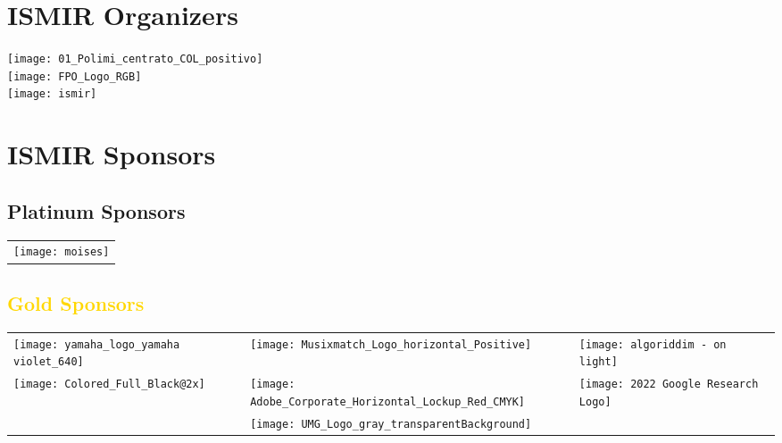 \section*{\textbf{ISMIR Organizers}}
\begin{center}
\vfill
\texttt{[image: 01\_Polimi\_centrato\_COL\_positivo]}\\
\vfill
\texttt{[image: FPO\_Logo\_RGB]}\\
\vfill
\texttt{[image: ismir]}\\
\vfill
\end{center}
\clearpage


\section*{\textbf{ISMIR Sponsors}}
\begingroup %
\renewcommand{\arraystretch}{3}

\vfill

\subsection*{\textcolor{platinum}{Platinum Sponsors}}
\begin{tabularx}{\textwidth} { 
 >{\centering\arraybackslash}X
}
\texttt{[image: moises]}
\\
\end{tabularx}

\vfill

\subsection*{\textcolor{gold}{Gold Sponsors}}
\begin{tabularx}{\textwidth} { 
 >{\centering\arraybackslash}X 
 >{\centering\arraybackslash}X 
 >{\centering\arraybackslash}X
}
\texttt{[image: yamaha\_logo\_yamaha violet\_640]} &
\texttt{[image: Musixmatch\_Logo\_horizontal\_Positive]} &
\texttt{[image: algoriddim - on light]}\\

\texttt{[image: Colored\_Full\_Black@2x]} &
\texttt{[image: Adobe\_Corporate\_Horizontal\_Lockup\_Red\_CMYK]} &
\texttt{[image: 2022 Google Research Logo]}\\

&
\texttt{[image: UMG\_Logo\_gray\_transparentBackground]} &
\\
\end{tabularx}

